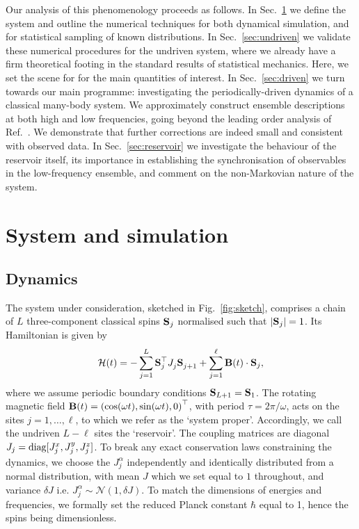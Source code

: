 \documentclass[aps,pre,twocolumn,notitlepage,floats,10pt]{revtex4-1}
\def\ptop{{\vphantom\top}}
\newcommand{\be}{\begin{equation}}
\newcommand{\ee}{\end{equation}}
\begin{document}
Our analysis of this phenomenology proceeds as follows.
In Sec.~\ref{sec:system} we define the system and outline the numerical
techniques for both dynamical simulation, and for statistical sampling of
known distributions.
In Sec.~\ref{sec:undriven} we validate these numerical procedures for the
undriven system, where we already have a firm theoretical footing in the
standard results of statistical mechanics. 
Here, we set the scene for for the main quantities of interest.
In Sec.~\ref{sec:driven} we turn towards our main programme:
investigating the periodically-driven dynamics of a classical many-body system.
We approximately construct ensemble descriptions at both high and low frequencies,
going beyond the leading order analysis of Ref.~\cite{short-paper}.
We demonstrate that further corrections are indeed small and consistent with
observed data.
In Sec.~\ref{sec:reservoir} we investigate the behaviour of the reservoir
itself, its importance in establishing the synchronisation of observables in
the low-frequency ensemble, and comment on the non-Markovian nature of the
system.

\section{System and simulation} \label{sec:system}

\subsection{Dynamics}

The system under consideration, sketched in Fig.~\ref{fig:sketch}, comprises a
chain of $L$ three-component classical spins ${\bf S}_j$ normalised such that
$|{\bf S}_j| = 1$.
Its Hamiltonian is given by
\be
\mathcal{H}(t) = - \sum_{j=1}^L {\bf S}_j^\top J_j^\ptop {\bf S}_{j+1}^\ptop + \sum_{j=1}^\ell {\bf B}(t) \cdot {\bf S}_j,
\label{eq:Hfull}
\ee
where we assume periodic boundary conditions ${\bf S}_{L+1} = {\bf S}_1$.
The rotating magnetic field ${\bf B}(t) = \left(\cos (\omega t), \sin (\omega
    t), 0\right)^\top$, with period $\tau = 2\pi/\omega$, acts on the sites
$j=1,\ldots,\ell$, to which we refer as the `system proper'.
Accordingly, we call the undriven $L-\ell$ sites the `reservoir'.
The coupling matrices are diagonal $J_j = {\rm diag}[J_j^x,J_j^y,J_j^z]$.
To break any exact conservation laws constraining the dynamics, we choose the
$J_j^\alpha$ independently and identically distributed from a normal
distribution, with mean $J$ which we set equal to $1$ throughout, and variance
$\delta J$ i.e. $J_j^\alpha \sim \mathcal{N}(1,\delta J)$.
To match the dimensions of energies and frequencies, we formally set the reduced
Planck constant $\hbar$ equal to 1, hence the spins being dimensionless.
\end{document}
